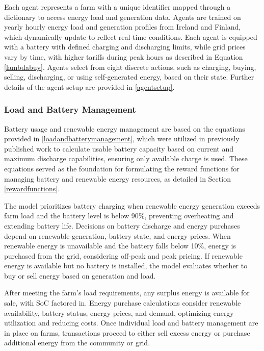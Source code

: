 \documentclass[preprint,12pt]{elsarticle}
\begin{document}
Each agent represents a farm with a unique identifier mapped through a dictionary to access energy load and generation data. Agents are trained on yearly hourly energy load and generation profiles from Ireland and Finland, which dynamically update to reflect real-time conditions. Each agent is equipped with a battery with defined charging and discharging limits, while grid prices vary by time, with higher tariffs during peak hours as described in Equation \ref{lambdabuy}. Agents select from eight discrete actions, such as charging, buying, selling, discharging, or using self-generated energy, based on their state. Further details of the agent setup are provided in \ref{agentsetup}.





\subsubsection{Load and Battery Management}


Battery usage and renewable energy management are based on the equations provided in \ref{loadandbatterymanagement}, which were utilized in previously published work to calculate usable battery capacity based on current and maximum discharge capabilities, ensuring only available charge is used. These equations served as the foundation for formulating the reward functions for managing battery and renewable energy resources, as detailed in Section \ref{rewardfunctions}.

The model prioritizes battery charging when renewable energy generation exceeds farm load and the battery level is below 90\%, preventing overheating and extending battery life. Decisions on battery discharge and energy purchases depend on renewable generation, battery state, and energy prices. When renewable energy is unavailable and the battery falls below 10\%, energy is purchased from the grid, considering off-peak and peak pricing. If renewable energy is available but no battery is installed, the model evaluates whether to buy or sell energy based on generation and load.

After meeting the farm’s load requirements, any surplus energy is available for sale, with SoC factored in. Energy purchase calculations consider renewable availability, battery status, energy prices, and demand, optimizing energy utilization and reducing costs. Once individual load and battery management are in place on farms, transactions proceed to either sell excess energy or purchase additional energy from the community or grid.
\end{document}
